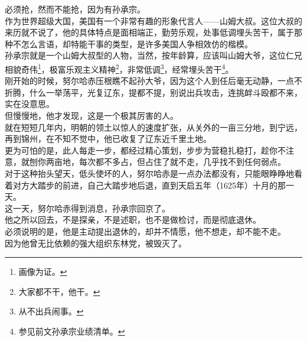 \begin{multicols}{\theparacolNo}
必须抢，然而不能抢，因为有孙承宗。\\

作为世界超级大国，美国有一个非常有趣的形象代言人——山姆大叔。这位大叔的来历就不说了，他的具体特点是面相端正，勤劳乐观，处事低调埋头苦干，属于那种不怎么言语，却特能干事的类型，是许多美国人争相效仿的楷模。\\

孙承宗就是一个山姆大叔型的人物，当然，按年龄算，应该叫山姆大爷，这位仁兄相貌奇伟\footnote{画像为证。}，极富乐观主义精神\footnote{大家都不干，他干。}，非常低调\footnote{从不出兵闹事。}，经常埋头苦干\footnote{参见前文孙承宗业绩清单。}。\\

刚开始的时候，努尔哈赤压根瞧不起孙大爷，因为这个人到任后毫无动静，一点不折腾，什么一举荡平，光复辽东，提都不提，别说出兵攻击，连挑衅斗殴都不来，实在没意思。\\

但慢慢地，他才发现，这是一个极其厉害的人。\\

就在短短几年内，明朝的领土以惊人的速度扩张，从关外的一亩三分地，到宁远，再到锦州，在不知不觉中，他已收复了辽东近千里土地。\\

更为可怕的是，此人每走一步，都经过精心策划，步步为营稳扎稳打，趁你不注意，就刨你两亩地，每次都不多占，但占住了就不走，几乎找不到任何弱点。\\

对于这种抬头望天，低头使坏的人，努尔哈赤是一点办法都没有，只能眼睁睁地看着对方大踏步的前进，自己大踏步地后退，直到天启五年（1625年）十月的那一天。\\

这一天，努尔哈赤得到消息，孙承宗回京了。\\

他之所以回去，不是探亲，不是述职，也不是做检讨，而是彻底退休。\\

必须说明的是，他是主动提出退休的，却并不情愿，他不想走，却不能不走。\\

因为他曾无比依赖的强大组织东林党，被毁灭了。\\
\ifnum{}
	\end{multicols}
\fi
\newpage
